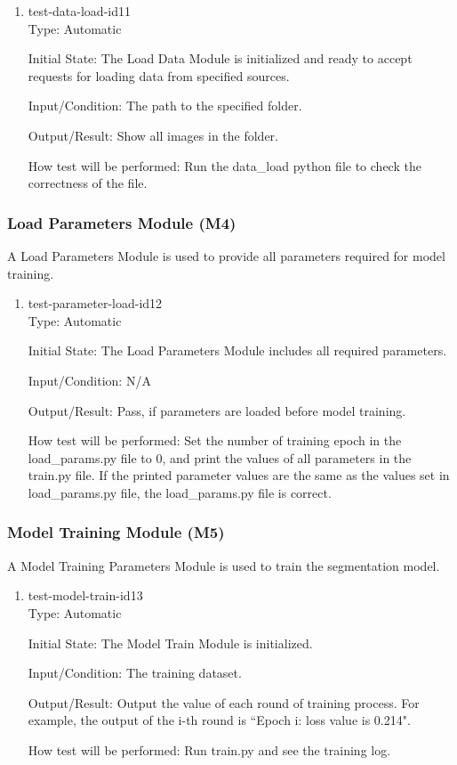 \documentclass[12pt, titlepage]{article}
\begin{document}
\begin{enumerate}

\item{test-data-load-id11\\}
Type: Automatic
					
Initial State: The Load Data Module is initialized and ready to accept requests for loading data from specified sources.
					
Input/Condition: The path to the specified folder. 
					
Output/Result: Show all images in the folder.  
					
How test will be performed: Run the data\_load python file to check the correctness of the file.  

\end{enumerate}

\subsubsection{Load Parameters Module (M4)}
A Load Parameters Module is used to provide all parameters required for model training.

\begin{enumerate}

\item{test-parameter-load-id12\\}
Type: Automatic
					
Initial State: The Load Parameters Module includes all required parameters.
					
Input/Condition: N/A 
					
Output/Result: Pass, if parameters are loaded before model training.  
					
How test will be performed: Set the number of training epoch in the load\_params.py file to 0, and print the values of all parameters in the train.py file. If the printed parameter values are the same as the values set in load\_params.py file, the load\_params.py file is correct.  

\end{enumerate}


\subsubsection{Model Training Module (M5)}
A Model Training Parameters Module is used to train the segmentation model.

\begin{enumerate}

\item{test-model-train-id13\\}
Type: Automatic
					
Initial State: The Model Train Module is initialized.
					
Input/Condition: The training dataset. 
					
Output/Result: Output the value of each round of training process. For example, the output of the i-th round is ``Epoch i: loss value is 0.214".
					
How test will be performed: Run train.py and see the training log.  

\end{enumerate}
\end{document}

